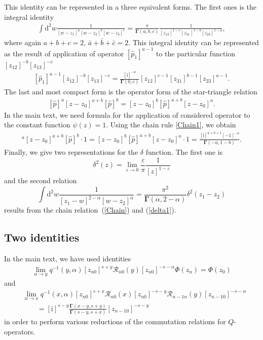 \documentclass[10pt,a4paper]{amsart}
\renewcommand{\imath}{\mathrm{i}}
\numberwithin{equation}{section}
\begin{document}
This identity can be represented in a three equivalent forms.
The first ones is the integral identity
\begin{align}\label{Star}
\int \mathrm{d}^2 w \frac{1}{[w-z_1]^a[w-z_2]^b [w-z_3]^c}
 = \frac{\pi}{\mathbf{\Gamma}(a,b,c)}
\frac{1}{[z_{12}]^{1-c}[z_{31}]^{1-b}[z_{23}]^{1-a}} ,
\end{align}
where again $a+b+c=2$, $\bar a+\bar b+\bar c=2$.
This integral identity can be represented as the result of application
of operator $[\hat{p}_1]^{a-1}$ to the particular function
$[z_{12}]^{-b} [z_{13}]^{-c}$
\begin{align}\label{Star1}
[\hat{p}_1]^{a-1} [z_{12}]^{-b} [z_{13}]^{-c}
= \frac{[\imath]^{-a}}
{\mathbf{\Gamma}(b,c)}
[z_{12}]^{c-1} [z_{31}]^{b-1} [z_{23}]^{a-1}.
\end{align}
The last and most compact form is the operator form of the star-triangle relation \cite{DM1,DM2, Isa}
\begin{align}\label{star-tr}
[\hat{p}]^{a} [z-z_0]^{a+b} [\hat{p}]^{b} =
[z-z_0]^{b} [\hat{p}]^{a+b} [z-z_0]^{a}.
\end{align}
In the main text, we need formula for the application of considered operator to the constant function $\psi(z) = 1$. Using the chain rule
\eqref{Chain1}, we obtain
\begin{align*}
[\hat{p}]^{a} [z -z_0]^{a+b} [\hat{p}]^{b}\cdot 1 =
[z-z_0]^{b} [\hat{p}]^{a+b} [z-z_0]^{a}\cdot 1 =
\frac{[\imath]^{a+b+1} [-1]^{-b}}{\mathbf{\Gamma}(-a,1-b)}.
\end{align*}
Finally, we give two representations for the $\delta$ function.
The first one is
\begin{equation}\label{delta1}
	\delta^2(z)=\lim_{\varepsilon\to 0}\frac{\varepsilon}{\pi} \frac{1}{[z]^{1-\varepsilon}}
\end{equation}
and the second relation
\begin{equation*}
	\int \mathrm{d}^2 w \frac{1}{[z_1-w]^{2-\alpha}[w-z_2]^\alpha} =
	\frac{\pi^2}{\mathbf{\Gamma}(\alpha,2-\alpha)} \delta^2(z_1-z_2)
\end{equation*}
results from the chain relation~(\ref{Chain}) and (\ref{delta1}).

\subsection{Two identities}

In the main text, we have used identities
\begin{align}\label{del}
\lim\limits_{\alpha\to y}
q^{-1}(y,\alpha)
[z_{n0}]^{s+y} \mathcal{R}_{n 0}(y) [z_{n0}]^{-s-\alpha} \Phi(z_n) =
\Phi(z_0)
\end{align}
and
\begin{align}
& \nonumber
\lim\limits_{\alpha\to x}
q^{-1}(x,\alpha)
[z_{n0}]^{s+x} \mathcal{R}_{n 0}(x) [z_{n0}]^{-s-y}
\mathcal{R}_{n-1 n}(y) [z_{n-1 0}]^{-s-\alpha} \\
&\label{del1}
\qquad =
[\imath]^{s-y} \frac{\mathbf{\Gamma}(x-y,s+y)}
{\mathbf{\Gamma}(s-y,s+x)} [z_{n-1 0}]^{-s-y}
\end{align}
in order to perform various reductions of the commutation
relations for $Q$-operators.
\end{document}
